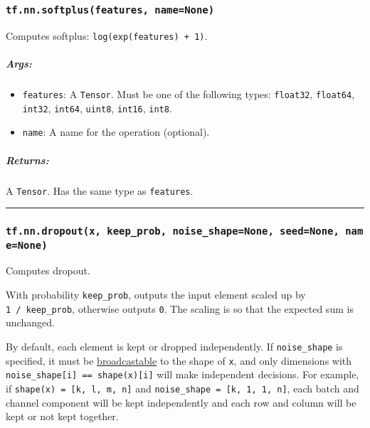 \subsubsection{\texorpdfstring{\texttt{tf.nn.softplus(features,\ name=None)}
}{tf.nn.softplus(features, name=None) }}\label{tf.nn.softplusfeatures-namenone}

Computes softplus: \texttt{log(exp(features)\ +\ 1)}.

\subparagraph{Args: }\label{args-2}

\begin{itemize}
\tightlist
\item
  \texttt{features}: A \texttt{Tensor}. Must be one of the following
  types: \texttt{float32}, \texttt{float64}, \texttt{int32},
  \texttt{int64}, \texttt{uint8}, \texttt{int16}, \texttt{int8}.
\item
  \texttt{name}: A name for the operation (optional).
\end{itemize}

\subparagraph{Returns: }\label{returns-2}

A \texttt{Tensor}. Has the same type as \texttt{features}.

\begin{center}\rule{0.5\linewidth}{\linethickness}\end{center}

\subsubsection{\texorpdfstring{\texttt{tf.nn.dropout(x,\ keep\_prob,\ noise\_shape=None,\ seed=None,\ name=None)}
}{tf.nn.dropout(x, keep\_prob, noise\_shape=None, seed=None, name=None) }}\label{tf.nn.dropoutx-keepux5fprob-noiseux5fshapenone-seednone-namenone}

Computes dropout.

With probability \texttt{keep\_prob}, outputs the input element scaled
up by \texttt{1\ /\ keep\_prob}, otherwise outputs \texttt{0}. The
scaling is so that the expected sum is unchanged.

By default, each element is kept or dropped independently. If
\texttt{noise\_shape} is specified, it must be
\href{http://docs.scipy.org/doc/numpy/user/basics.broadcasting.html}{broadcastable}
to the shape of \texttt{x}, and only dimensions with
\texttt{noise\_shape{[}i{]}\ ==\ shape(x){[}i{]}} will make independent
decisions. For example, if \texttt{shape(x)\ =\ {[}k,\ l,\ m,\ n{]}} and
\texttt{noise\_shape\ =\ {[}k,\ 1,\ 1,\ n{]}}, each batch and channel
component will be kept independently and each row and column will be
kept or not kept together.

